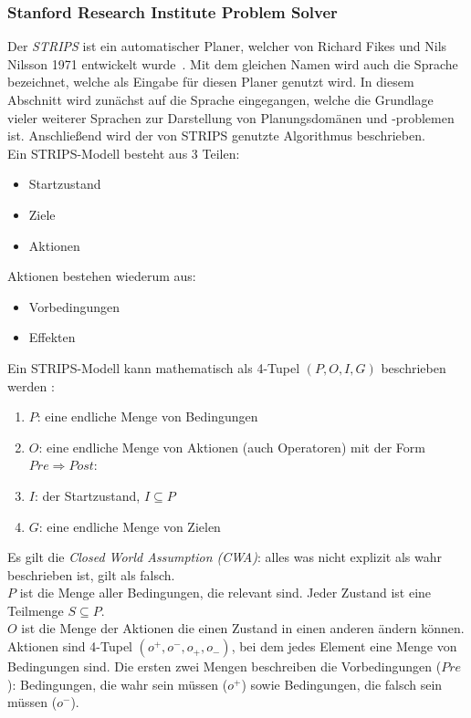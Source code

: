 \subsubsection{Stanford Research Institute Problem Solver}{\label{chap:strips}}
Der \emph{\ac{STRIPS}} ist ein automatischer Planer, welcher von Richard Fikes und Nils Nilsson 1971 entwickelt wurde~\cite{FIKES1971189}.
Mit dem gleichen Namen wird auch die Sprache bezeichnet, welche als Eingabe für diesen Planer genutzt wird.
In diesem Abschnitt wird zunächst auf die Sprache eingegangen, welche die Grundlage vieler weiterer Sprachen zur Darstellung von Planungsdomänen und -problemen ist.
Anschließend wird der von \ac{STRIPS} genutzte Algorithmus beschrieben.\\
Ein \ac{STRIPS}-Modell besteht aus 3 Teilen:
\begin{itemize}
    \item Startzustand
    \item Ziele
    \item Aktionen
\end{itemize}
Aktionen bestehen wiederum aus:
\begin{itemize}
    \item Vorbedingungen
    \item Effekten
\end{itemize}
Ein \ac{STRIPS}-Modell kann mathematisch als 4-Tupel \((P,O,I,G)\) beschrieben werden \cite{stripsdef}:
\begin{enumerate}
    \item \(P\): eine endliche Menge von Bedingungen
    \item \(O\): eine endliche Menge von Aktionen (auch Operatoren) mit der Form $Pre \Rightarrow Post$:
    \item \(I\): der Startzustand, $I\subseteq P$
    \item \(G\): eine endliche Menge von Zielen
\end{enumerate}
Es gilt die \emph{Closed World Assumption (CWA)}: alles was nicht explizit als wahr beschrieben ist, gilt als falsch.\\
$P$ ist die Menge aller Bedingungen, die relevant sind.
Jeder Zustand ist eine Teilmenge $S\subseteq P$.\\
$O$ ist die Menge der Aktionen die einen Zustand in einen anderen ändern können.
Aktionen sind 4-Tupel \((o^+,o^-,o_+,o_-)\), bei dem jedes Element eine Menge von Bedingungen sind.
Die ersten zwei Mengen beschreiben die Vorbedingungen ($Pre$): Bedingungen, die wahr sein müssen ($o^+$) sowie Bedingungen, die falsch sein müssen ($o^-$).
